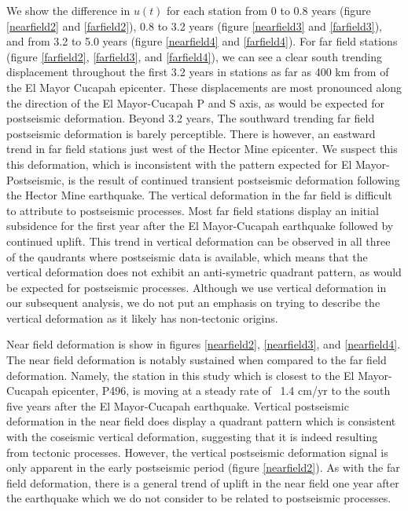 \documentclass[12pt]{article}
\begin{document}
We show the difference in $u(t)$ for each station from 0 to 0.8 years (figure \ref{nearfield2} and \ref{farfield2}), 0.8 to 3.2 years (figure \ref{nearfield3} and \ref{farfield3}), and from 3.2 to 5.0 years (figure \ref{nearfield4} and \ref{farfield4}).  For far field stations (figure \ref{farfield2}, \ref{farfield3}, and \ref{farfield4}), we can see a clear south trending displacement throughout the first 3.2 years in stations as far as 400 km from of the El Mayor Cucapah epicenter.  These displacements are most pronounced along the direction of the El Mayor-Cucapah P and S axis, as would be expected for postseismic deformation.  Beyond 3.2 years, The southward trending far field postseismic deformation is barely perceptible. There is however, an eastward trend in far field stations just west of the Hector Mine epicenter.  We suspect this this deformation, which is inconsistent with the pattern expected for El Mayor-Postseismic, is the result of continued transient postseismic deformation following the Hector Mine earthquake.  The vertical deformation in the far field is difficult to attribute to postseismic processes.  Most far field stations display an initial subsidence for the first year after the El Mayor-Cucapah earthquake followed by continued uplift.  This trend in vertical deformation can be observed in all three of the qaudrants where postseismic data is available, which means that the vertical deformation does not exhibit an anti-symetric quadrant pattern, as would be expected for postseismic processes.  Although we use vertical deformation in our subsequent analysis, we do not put an emphasis on trying to describe the vertical deformation as it likely has non-tectonic origins.        

Near field deformation is show in figures \ref{nearfield2}, \ref{nearfield3}, and \ref{nearfield4}.  The near field deformation is notably sustained when compared to the far field deformation.  Namely, the station in this study which is closest to the El Mayor-Cucapah epicenter, P496, is moving at a steady rate of ~1.4 cm/yr to the south five years after the El Mayor-Cucapah earthquake.  Vertical postseismic deformation in the near field does display a quadrant pattern which is consistent with the coseismic vertical deformation, suggesting that it is indeed resulting from tectonic processes.  However, the vertical postseismic deformation signal is only apparent in the early postseismic period (figure \ref{nearfield2}).  As with the far field deformation, there is a general trend of uplift in the near field one year after the earthquake which we do not consider to be related to postseismic processes.  
\end{document}
